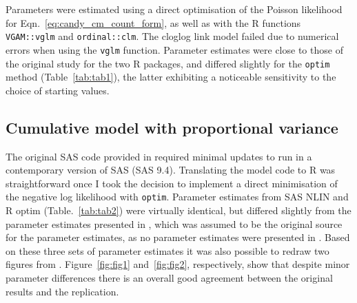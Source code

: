 Parameters were estimated using a direct optimisation of the Poisson likelihood for Eqn.~\ref{eq:candy_cm_count_form}, as well as with the R functions \verb+VGAM::vglm+ and \verb+ordinal::clm+. 
The cloglog link model failed due to numerical errors when using the \verb+vglm+ function. 
Parameter estimates were close to those of the original study for the two R packages, and differed slightly for the \verb+optim+ method (Table~\ref{tab:tab1}), the latter exhibiting a noticeable sensitivity to the choice of starting values.

\subsection{Cumulative model with proportional variance}



The original SAS code provided in \citep{dennis1986stochastic} required minimal updates to run in a contemporary version of SAS (SAS 9.4). 
Translating the model code to R was straightforward once I took the decision to implement a direct minimisation of the negative log likelihood with \verb+optim+.  
Parameter estimates from SAS NLIN and R optim (Table.~\ref{tab:tab2}) were virtually identical, but differed slightly from the parameter estimates presented in \citep{kemp1986stochastic}, which was assumed to be the original source for the parameter estimates, as no parameter estimates were presented in \citep{dennis1986stochastic}. 
Based on these three sets of parameter estimates it was also possible to redraw two figures from \citep{dennis1986stochastic}. 
Figure~\ref{fig:fig1} and~\ref{fig:fig2}, respectively,  show that despite minor parameter differences there is an overall good agreement between the original results and the replication.


